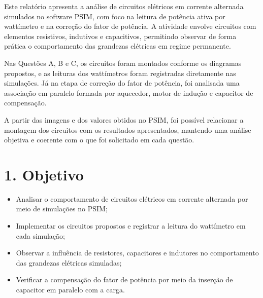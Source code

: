 \documentclass[12pt,a4paper]{article}
\begin{document}
Este relatório apresenta a análise de circuitos elétricos em corrente alternada simulados no software PSIM, com foco na leitura de potência ativa por wattímetro e na correção do fator de potência. A atividade envolve circuitos com elementos resistivos, indutivos e capacitivos, permitindo observar de forma prática o comportamento das grandezas elétricas em regime permanente.

Nas Questões A, B e C, os circuitos foram montados conforme os diagramas propostos, e as leituras dos wattímetros foram registradas diretamente nas simulações. Já na etapa de correção do fator de potência, foi analisada uma associação em paralelo formada por aquecedor, motor de indução e capacitor de compensação.

A partir das imagens e dos valores obtidos no PSIM, foi possível relacionar a montagem dos circuitos com os resultados apresentados, mantendo uma análise objetiva e coerente com o que foi solicitado em cada questão.

\clearpage
\setcounter{page}{1}

\tableofcontents

\newpage

\section*{1. Objetivo}

\begin{itemize}
\item Analisar o comportamento de circuitos elétricos em corrente alternada por meio de simulações no PSIM;
\item Implementar os circuitos propostos e registrar a leitura do wattímetro em cada simulação;
\item Observar a influência de resistores, capacitores e indutores no comportamento das grandezas elétricas simuladas;
\item Verificar a compensação do fator de potência por meio da inserção de capacitor em paralelo com a carga.
\end{itemize}

\end{document}
